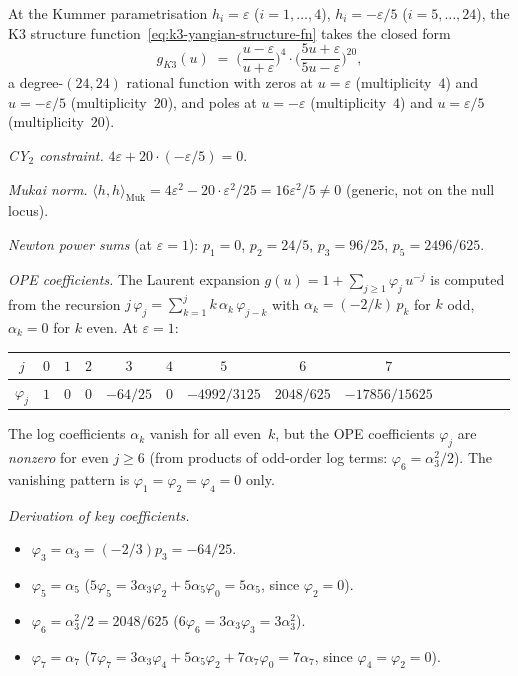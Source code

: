 \begin{proposition}
\label{prop:k3-kummer-structure-function}
At the Kummer parametrisation
$h_i = \varepsilon$ ($i = 1, \ldots, 4$),
$h_i = -\varepsilon/5$ ($i = 5, \ldots, 24$),
the K3 structure function~\eqref{eq:k3-yangian-structure-fn}
takes the closed form
\begin{equation}\label{eq:k3-explicit-g}
 g_{K3}(u) \;=\;
 \biggl(\frac{u - \varepsilon}{u + \varepsilon}\biggr)^{\!4}
 \cdot
 \biggl(\frac{5u + \varepsilon}{5u - \varepsilon}\biggr)^{\!20},
\end{equation}
a degree-$(24,24)$ rational function with zeros at
$u = \varepsilon$ (multiplicity~$4$) and $u = -\varepsilon/5$
(multiplicity~$20$), and poles at $u = -\varepsilon$ (multiplicity~$4$)
and $u = \varepsilon/5$ (multiplicity~$20$).

\emph{CY$_2$ constraint.}
$4\varepsilon + 20 \cdot (-\varepsilon/5) = 0$.

\emph{Mukai norm.}
$\langle h, h \rangle_{\mathrm{Muk}}
= 4\varepsilon^2 - 20 \cdot \varepsilon^2/25
= 16\varepsilon^2/5 \neq 0$
(generic, not on the null locus).

\emph{Newton power sums} (at $\varepsilon = 1$):
$p_1 = 0$, $p_2 = 24/5$, $p_3 = 96/25$, $p_5 = 2496/625$.

\emph{OPE coefficients.}
The Laurent expansion $g(u) = 1 + \sum_{j \geq 1} \varphi_j\, u^{-j}$
is computed from the recursion
$j\, \varphi_j = \sum_{k=1}^{j} k\, \alpha_k\, \varphi_{j-k}$
with $\alpha_k = (-2/k)\, p_k$ for $k$ odd, $\alpha_k = 0$ for $k$ even.
At $\varepsilon = 1$:
\begin{center}
\renewcommand{\arraystretch}{1.3}
\begin{tabular}{c|ccccccccccccc}
$j$ & $0$ & $1$ & $2$ & $3$ & $4$ & $5$ & $6$ & $7$ \\
\hline
$\varphi_j$ & $1$ & $0$ & $0$ & $-64/25$ & $0$ &
$-4992/3125$ & $2048/625$ & $-17856/15625$
\end{tabular}
\end{center}
The log coefficients $\alpha_k$ vanish for all even~$k$, but
the OPE coefficients $\varphi_j$ are \emph{nonzero} for even $j \geq 6$
(from products of odd-order log terms: $\varphi_6 = \alpha_3^2/2$).
The vanishing pattern is $\varphi_1 = \varphi_2 = \varphi_4 = 0$
only.

\emph{Derivation of key coefficients.}
\begin{itemize}
 \item $\varphi_3 = \alpha_3 = (-2/3) p_3 = -64/25$.
 \item $\varphi_5 = \alpha_5$\quad
 ($5\varphi_5 = 3\alpha_3 \varphi_2 + 5\alpha_5 \varphi_0
 = 5\alpha_5$, since $\varphi_2 = 0$).
 \item $\varphi_6 = \alpha_3^2/2 = 2048/625$\quad
 ($6\varphi_6 = 3\alpha_3 \varphi_3 = 3\alpha_3^2$).
 \item $\varphi_7 = \alpha_7$\quad
 ($7\varphi_7 = 3\alpha_3 \varphi_4 + 5\alpha_5 \varphi_2
 + 7\alpha_7 \varphi_0 = 7\alpha_7$, since $\varphi_4 = \varphi_2 = 0$).
\end{itemize}
\end{proposition}

